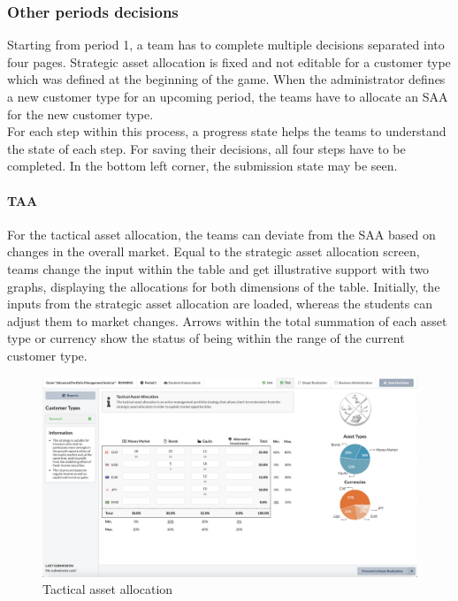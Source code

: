 \subsubsection{Other periods decisions}
Starting from period 1, a team has to complete multiple decisions separated into four pages. Strategic asset allocation is fixed and not editable for a customer type which was defined at the beginning of the game. When the administrator defines a new customer type for an upcoming period, the teams have to allocate an SAA for the new customer type.\\

For each step within this process, a progress state helps the teams to understand the state of each step. For saving their decisions, all four steps have to be completed. In the bottom left corner, the submission state may be seen.

\paragraph{TAA}
For the tactical asset allocation, the teams can deviate from the SAA based on changes in the overall market. Equal to the strategic asset allocation screen, teams change the input within the table and get illustrative support with two graphs, displaying the allocations for both dimensions of the table. Initially, the inputs from the strategic asset allocation are loaded, whereas the students can adjust them to market changes. Arrows within the total summation of each asset type or currency show the status of being within the range of the current customer type.
\begin{figure}[h!]
  \centering
  \includegraphics[scale=0.2]{img/application-overview/teams/04_taa.png}
  \caption{Tactical asset allocation}
\end{figure}

